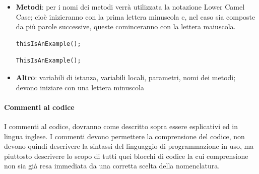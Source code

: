 \documentclass[11pt,a4paper]{article}
\begin{document}
{\begin{itemize}
\begin{multicols}{2}
			\begin{lstlisting}[caption=nome costante scorretto]
			var MaxLenght = 100;
			\end{lstlisting}
		\end{multicols}
		
		\item \textbf{Metodi}: per i nomi dei metodi verrà utilizzata la notazione Lower Camel Case; cioè inizieranno con la prima lettera minuscola e, nel caso sia composte da più parole successive, queste cominceranno con la lettera maiuscola.
	

\begin{multicols}{2}
	\begin{lstlisting}[caption=nome metodo corretto]
	thisIsAnExample();
	\end{lstlisting}

	\begin{lstlisting}[caption=nome metodo scorretto]
 	ThisIsAnExample();
	\end{lstlisting}
\end{multicols}


		\item \textbf{Altro}: variabili di istanza, variabili locali, parametri, nomi dei metodi; devono iniziare con una lettera minuscola
	\end{itemize}
	
	\paragraph{Commenti al codice}
	I commenti al codice, dovranno come descritto sopra essere esplicativi ed in lingua inglese.
	I commenti devono permettere la comprensione del codice, non
	devono quindi descrivere la sintassi del linguaggio di programmazione in uso, ma piuttosto descrivere lo scopo di tutti quei blocchi di codice la cui comprensione non sia già resa immediata da una corretta scelta della nomenclatura.
	
}
\end{document}
